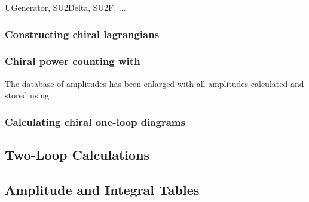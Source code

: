 
UGenerator, SU2Delta, SU2F, ...

\subsubsection{Constructing chiral lagrangians}
\label{chptLags}

\subsubsection{Chiral power counting with \fa}

The database of amplitudes has been enlarged with all amplitudes calculated and stored using 

\subsubsection{Calculating chiral one-loop diagrams}

\subsection{Two-Loop Calculations}

\subsection{Amplitude and Integral Tables}
